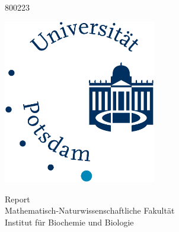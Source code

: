 
\begin{titlepage}
    \begin{center}
        {\LARGE  

        \hfill

        \vfill

        {} \\ \smallskip
	 {800223} \\ \bigskip
	
        {\color{Maroon}} 

        }

        \vfill

        \includegraphics[width=0.5\textwidth]{Frontpage/Mathnatlogo} \\ \bigskip

	 \vfill

		Report\\
		Mathematisch-Naturwissenschaftliche Fakult\"{a}t\\
		Institut für Biochemie und Biologie\\


        \vfill                      

    \end{center}        
\end{titlepage} 